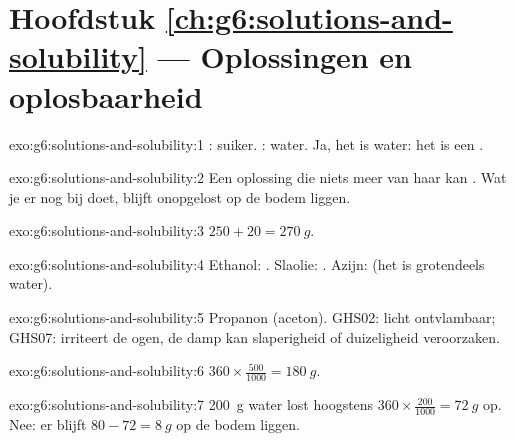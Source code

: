 \section*{Hoofdstuk \ref{ch:g6:solutions-and-solubility} --- Oplossingen en oplosbaarheid}

\begin{solution}{exo:g6:solutions-and-solubility:1}
: suiker. : water. Ja, het  is
water: het is een .
\end{solution}

\begin{solution}{exo:g6:solutions-and-solubility:2}
Een oplossing die niets meer van haar  kan . Wat
je er nog bij doet, blijft onopgelost op de bodem liggen.
\end{solution}

\begin{solution}{exo:g6:solutions-and-solubility:3}
$250 + 20 = \qty{270}{g}$.
\end{solution}

\begin{solution}{exo:g6:solutions-and-solubility:4}
Ethanol: . Slaolie: . Azijn:  (het is
grotendeels water).
\end{solution}

\begin{solution}{exo:g6:solutions-and-solubility:5}
Propanon (aceton). GHS02: licht ontvlambaar; GHS07: irriteert de ogen,
de damp kan slaperigheid of duizeligheid veroorzaken.
\end{solution}

\begin{solution}{exo:g6:solutions-and-solubility:6}
$360 \times \frac{500}{1000} = \qty{180}{g}$.
\end{solution}

\begin{solution}{exo:g6:solutions-and-solubility:7}
\qty{200}{g} water lost hoogstens $360 \times \frac{200}{1000} =
\qty{72}{g}$ op. Nee: er blijft $80 - 72 = \qty{8}{g}$ op de bodem
liggen.
\end{solution}

